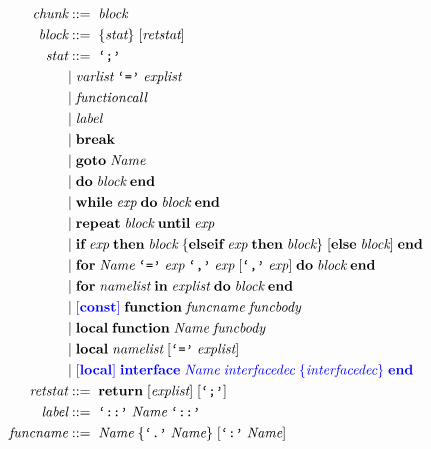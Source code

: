 \allowdisplaybreaks
\begin{align*}
\textit{chunk} & ::= \; \textit{block}\\
\textit{block} & ::= \; \{\textit{stat}\} \; [\textit{retstat}]\\
\textit{stat} & ::= \; \texttt{`;'}\\
& | \; \textit{varlist} \; \texttt{`='} \; \textit{explist}\\
& | \; \textit{functioncall}\\
& | \; \textit{label}\\
& | \; \textbf{break}\\ 
& | \; \textbf{goto} \; \textit{Name}\\
& | \; \textbf{do} \; \textit{block} \; \textbf{end}\\
& | \; \textbf{while} \; \textit{exp} \; \textbf{do} \; \textit{block} \; \textbf{end}\\
& | \; \textbf{repeat} \; \textit{block} \; \textbf{until} \; \textit{exp}\\
& | \; \textbf{if} \; \textit{exp} \; \textbf{then} \; \textit{block} \;
  \{\textbf{elseif} \; \textit{exp} \; \textbf{then} \; \textit{block}\} \;
  [\textbf{else} \; \textit{block}] \; \textbf{end}\\ 
& | \; \textbf{for} \; \textit{Name} \; \texttt{`='} \; \textit{exp} \;
  \texttt{`,'} \; \textit{exp} \; [\texttt{`,'} \; \textit{exp}] \;
  \textbf{do} \; \textit{block} \; \textbf{end}\\
& | \; \textbf{for} \; \textit{namelist} \; \textbf{in} \; \textit{explist} \;
  \textbf{do} \; \textit{block} \; \textbf{end}\\
& | \; \textcolor{blue}{[\textbf{const}]} \; \textbf{function} \; \textit{funcname} \; \textit{funcbody}\\
& | \; \textbf{local} \; \textbf{function} \; \textit{Name} \; \textit{funcbody}\\
& | \; \textbf{local} \; \textit{namelist} \; [\texttt{`='} \; \textit{explist}]\\
& | \; \textcolor{blue}{[\textbf{local}] \; \textbf{interface} \; \textit{Name} \; \textit{interfacedec} \;
  \{\textit{interfacedec}\} \; \textbf{end}}\\
\textit{retstat} & ::= \; \textbf{return} \; [\textit{explist}] \; [\texttt{`;'}]\\
\textit{label} & ::= \; \texttt{`::'} \; \textit{Name} \; \texttt{`::'}\\
\textit{funcname} & ::= \; \textit{Name} \; \{\texttt{`.'} \; \textit{Name}\} \; [\texttt{`:'} \; \textit{Name}]\\

\end{align*}
